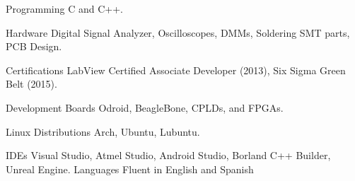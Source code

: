 
\begin{cvskills}


	\cvskill
		{Programming}
			{C and C++.}

	\cvskill
		{Hardware}
			{Digital Signal Analyzer, Oscilloscopes, DMMs, Soldering SMT parts, PCB Design.}

	\cvskill
		{Certifications}
			{LabView Certified Associate Developer (2013), Six Sigma Green Belt (2015).}

	\cvskill
		{Development Boards}
			{Odroid, BeagleBone, CPLDs, and FPGAs.}

	\cvskill
		{Linux Distributions}
			{Arch, Ubuntu, Lubuntu.}

	\cvskill
		{IDEs}
			{Visual Studio, Atmel Studio, Android Studio, Borland C++ Builder, Unreal Engine.}
	\cvskill
		{Languages}
			{Fluent in English and Spanish}

\end{cvskills}
